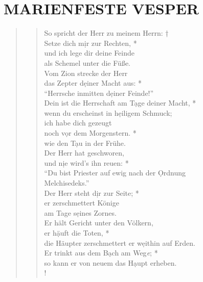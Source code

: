 

\section[]{MARIENFESTE VESPER}


\vspace{0.5cm}

\begin{quote}
\begin{verse}

So spricht der Herr zu meinem Herrn: †\\
Setze dich m\d ir zur Rechten, *\\
und ich lege dir deine Feinde\\
als Schemel unter die Füße.\\
\vin Vom Zion strecke der Herr \\
\vin das Zepter d\d einer Macht aus: *\\
\vin ``Herrsche inmitten d\d einer Feinde!''\\
Dein ist die Herrschaft am T\d age deiner Macht, *\\
wenn du erscheinst in h\d eiligem Schmuck;\\
\vin ich habe dich gezeugt\\ 
\vin noch v\d or dem Morgenstern. *\\
\vin wie den T\d au in der Frühe.\\
Der Herr hat geschworen,\\
und n\d ie wird’s ihn reuen: *\\
``Du bist Priester auf ewig nach der \d Ordnung \\
Melchisedeks.''\\
\vin Der Herr steht d\d ir zur Seite; *\\
\vin er zerschmettert Könige\\
\vin am Tage s\d eines Zornes.\\
Er hält Gericht unter den Völkern,\\
er h\d äuft die Toten, *\\
die Häupter zerschmettert er w\d eithin auf Erden.\\
Er trinkt aus dem B\d ach am Weg\textit{e}; *\\
so kann er von neuem das H\d aupt erheben.\\!
\end{verse}
\end{quote}

\newpage


